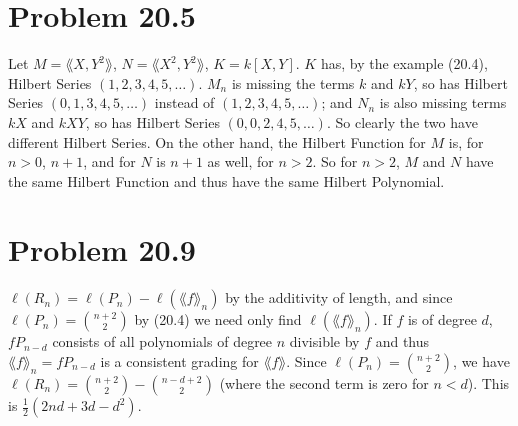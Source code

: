 \documentclass{pset}
\begin{document}
\section{Problem 20.5}
\label{sec-5}


Let $M = \lang X, Y^2 \rang$, $N = \lang X^2, Y^2 \rang$, $K = k[X, Y]$.  $K$ has, by
the example (20.4), Hilbert Series $(1, 2, 3, 4, 5, \dots)$.  $M_n$ is
missing the terms $k$ and $k Y$, so has Hilbert Series $(0, 1, 3, 4,
5, \dots)$ instead of $(1, 2, 3, 4, 5, \dots)$; and $N_n$ is also missing terms
$k X$ and $k X Y$, so has Hilbert Series $(0, 0, 2, 4, 5, \dots)$.  So
clearly the two have different Hilbert Series.  On the other hand, the
Hilbert Function for $M$ is, for $n > 0$, $n+1$, and for $N$ is $n+1$
as well, for $n > 2$.  So for $n > 2$, $M$ and $N$ have the same
Hilbert Function and thus have the same Hilbert Polynomial.
\section{Problem 20.9}
\label{sec-6}


$\ell(R_n) = \ell(P_n) - \ell(\lang f \rang_n)$ by the additivity of length, and
since $\ell(P_n) = \binom{n + 2}{2}$ by (20.4) we need only find
$\ell(\lang f \rang_n)$.  If $f$ is of degree $d$, $f P_{n-d}$ consists of all
polynomials of degree $n$ divisible by $f$ and thus $\lang f \rang_n = f
P_{n-d}$ is a consistent grading for $\lang f \rang$.  Since $\ell(P_n) =
\binom{n+2}{2}$, we have $\ell(R_n) = \binom{n+2}{2} - \binom{n - d +
2}{2}$ (where the second term is zero for $n < d$).  This is $\frac12(2 n
d + 3d - d^2)$.
\end{document}
